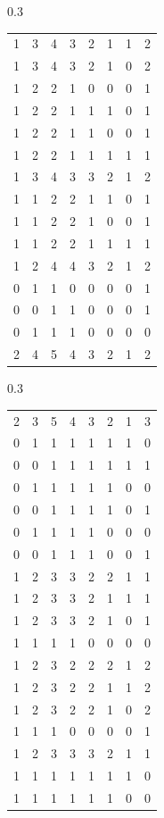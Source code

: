 \documentclass{amsart}
\theoremstyle{definition}
\theoremstyle{remark}
\numberwithin{equation}{section}
\begin{document}
\begin{table}[h]
\begin{subtable}{0.3\textwidth}
\begin{tabular}{llllllll}
1 & 3 & 4 & 3 & 2 & 1 & 1 & 2 \\
1 & 3 & 4 & 3 & 2 & 1 & 0 & 2 \\
1 & 2 & 2 & 1 & 0 & 0 & 0 & 1 \\
1 & 2 & 2 & 1 & 1 & 1 & 0 & 1 \\
1 & 2 & 2 & 1 & 1 & 0 & 0 & 1 \\
1 & 2 & 2 & 1 & 1 & 1 & 1 & 1 \\
1 & 3 & 4 & 3 & 3 & 2 & 1 & 2 \\
1 & 1 & 2 & 2 & 1 & 1 & 0 & 1 \\
1 & 1 & 2 & 2 & 1 & 0 & 0 & 1 \\
1 & 1 & 2 & 2 & 1 & 1 & 1 & 1 \\
1 & 2 & 4 & 4 & 3 & 2 & 1 & 2 \\
0 & 1 & 1 & 0 & 0 & 0 & 0 & 1 \\
0 & 0 & 1 & 1 & 0 & 0 & 0 & 1 \\
0 & 1 & 1 & 1 & 0 & 0 & 0 & 0 \\
2 & 4 & 5 & 4 & 3 & 2 & 1 & 2
\end{tabular}
\end{subtable}
\begin{subtable}{0.3\textwidth}
\centering
\begin{tabular}{llllllll}
2 & 3 & 5 & 4 & 3 & 2 & 1 & 3 \\
0 & 1 & 1 & 1 & 1 & 1 & 1 & 0 \\
0 & 0 & 1 & 1 & 1 & 1 & 1 & 1 \\
0 & 1 & 1 & 1 & 1 & 1 & 0 & 0 \\
0 & 0 & 1 & 1 & 1 & 1 & 0 & 1 \\
0 & 1 & 1 & 1 & 1 & 0 & 0 & 0 \\
0 & 0 & 1 & 1 & 1 & 0 & 0 & 1 \\
1 & 2 & 3 & 3 & 2 & 2 & 1 & 1 \\
1 & 2 & 3 & 3 & 2 & 1 & 1 & 1 \\
1 & 2 & 3 & 3 & 2 & 1 & 0 & 1 \\
1 & 1 & 1 & 1 & 0 & 0 & 0 & 0 \\
1 & 2 & 3 & 2 & 2 & 2 & 1 & 2 \\
1 & 2 & 3 & 2 & 2 & 1 & 1 & 2 \\
1 & 2 & 3 & 2 & 2 & 1 & 0 & 2 \\
1 & 1 & 1 & 0 & 0 & 0 & 0 & 1 \\
1 & 2 & 3 & 3 & 3 & 2 & 1 & 1 \\
1 & 1 & 1 & 1 & 1 & 1 & 1 & 0 \\
1 & 1 & 1 & 1 & 1 & 1 & 0 & 0 \\

\end{tabular}
\end{subtable}
\end{table}
\end{document}
